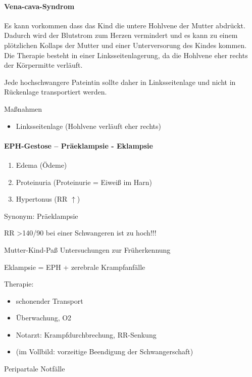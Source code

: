 \documentclass{article}
\begin{document}
\paragraph{Vena-cava-Syndrom}
Es kann vorkommen dass das Kind die untere Hohlvene der Mutter
abdr\"uckt. Dadurch wird der Blutstrom zum Herzen vermindert und es
kann zu einem pl\"otzlichen Kollaps der Mutter und einer Unterversorung
des Kindes kommen. Die Therapie besteht in einer Linksseitenlagerung,
da die Hohlvene eher rechts der K\"orpermitte verl\"auft. 

Jede hochschwangere Pateintin sollte daher in Linksseitenlage und nicht
in R\"uckenlage transportiert werden. 

Ma{\ss}nahmen

\begin{itemize}
\item Linksseitenlage (Hohlvene verl\"auft eher rechts)

\end{itemize}
\paragraph[EPH-Gestose -- Pr\"aeklampsie - Eklampsie]{EPH-Gestose --
Pr\"aeklampsie - Eklampsie}
\label{bkm:RefHeading39226112}\begin{enumerate}
\item Edema (\"Odeme)

\item Proteinuria (Proteinurie = Eiwei{\ss} im Harn)

\item Hypertonus (RR  ${\uparrow}$)

\end{enumerate}
Synonym: Pr\"aeklampsie

RR {\textgreater}140/90 bei einer Schwangeren ist zu  hoch!!!

Mutter-Kind-Pa{\ss} Untersuchungen zur  Fr\"uherkennung

Eklampsie = EPH + zerebrale  Krampfanf\"alle

Therapie:

\begin{itemize}
\item schonender Transport

\item \"Uberwachung, O2

\item Notarzt: Krampfdurchbrechung, RR-Senkung

\item (im Vollbild: vorzeitige Beendigung der  Schwangerschaft)

\end{itemize}
Peripartale Notf\"alle
\end{document}
